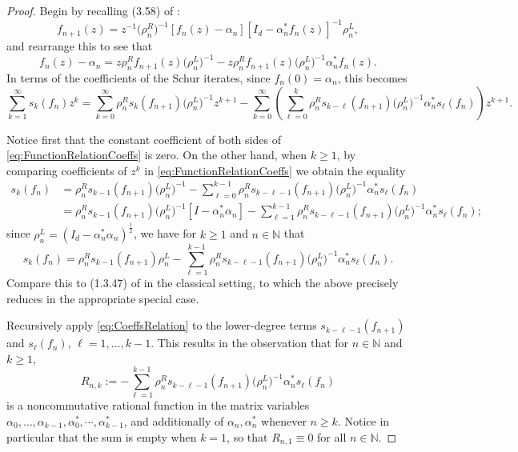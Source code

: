 \documentclass[11pt,reqno]{amsart}
\def\a{\alpha}
\def\r{\rho}
\def\NN{\mathbb{N}}
\theoremstyle{definition}
\numberwithin{equation}{section}
\begin{document}
\begin{proof}
    Begin by recalling (3.58) of \cite{DPS08}:
    \[
        f_{n+1}(z) = z^{-1} \big(\r_n^R\big)^{-1}[f_n(z) - \a_n][I_d - \a_n^* f_n(z)]^{-1} \r_n^L,
    \]
    and rearrange this to see that
    \[
        f_n(z) - \a_n = z \r_n^R f_{n+1}(z)\big(\r_n^L\big)^{-1} - z \r_n^R f_{n+1}(z)\big(\r_n^L\big)^{-1} \a_n^* f_n(z).
    \]
    In terms of the coefficients of the Schur iterates, since \(f_n(0) = \a_n\), this becomes
    \begin{equation}
    \label{eq:FunctionRelationCoeffs}
        \sum_{k=1}^{\infty} s_k(f_n) z^k = \sum_{k=0}^{\infty} \r_n^R s_k(f_{n+1}) \big(\r_n^L\big)^{-1} z^{k+1} - \sum_{k=0}^{\infty} \left( \sum_{\ell = 0}^{k} \r_n^R s_{k - \ell}(f_{n+1})\big(\r_n^L\big)^{-1} \a_n^* s_{\ell}(f_n)\right) z^{k+1}.
    \end{equation}
    
    Notice first that the constant coefficient of both sides of \eqref{eq:FunctionRelationCoeffs} is zero. On the other hand, when \(k \geq 1\), by comparing coefficients of \(z^k\) in \eqref{eq:FunctionRelationCoeffs} we obtain the equality
    \begin{align*}
        s_k(f_n) & = \r_n^R s_{k-1}(f_{n+1})\big(\r_n^L\big)^{-1} - \sum_{\ell = 0}^{k-1} \r_n^R s_{k - \ell - 1}(f_{n+1}) \big(\r_n^L\big)^{-1} \a_n^* s_{\ell}(f_n) \\
        & = \r_n^R s_{k-1}(f_{n+1}) \big(\r_n^L \big)^{-1}[I - \a_n^* \a_n] - \sum_{\ell=1}^{k-1} \r_n^R s_{k - \ell - 1}(f_{n+1})\big(\r_n^L\big)^{-1} \a_n^* s_{\ell}(f_n);
    \end{align*}
    since \(\r_n^L = (I_d - \a_n^* \a_n)^{\frac12}\), we have for \(k \geq 1\) and \(n \in \NN\) that
    \begin{equation}
    \label{eq:CoeffsRelation}
        s_k(f_n) = \r_n^R s_{k-1}(f_{n+1}) \r_n^L - \sum_{\ell=1}^{k-1} \r_n^R s_{k - \ell - 1}(f_{n+1})\big(\r_n^L\big)^{-1} \a_n^* s_{\ell}(f_n).
    \end{equation}
    Compare this to (1.3.47) of \cite{Sim05a} in the classical setting, to which the above precisely reduces in the appropriate special case.

    Recursively apply \eqref{eq:CoeffsRelation} to the lower-degree terms \(s_{k - \ell - 1}(f_{n+1})\) and \(s_{\ell}(f_n)\), \(\ell = 1, \ldots, k - 1\). This results in the observation that for \(n \in \NN\) and \(k \geq 1\),
    \[
        R_{n,k} := - \sum_{\ell=1}^{k-1} \r_n^R s_{k - \ell - 1}(f_{n+1})\big(\r_n^L\big)^{-1} \a_n^* s_{\ell}(f_n)
    \]
    is a noncommutative rational function in the matrix variables \(\a_0, \ldots, \a_{k-1}, \a_0^*, \cdots, \a_{k-1}^*\), and additionally of \(\a_n, \a_n^*\) whenever \(n \geq k\). Notice in particular that the sum is empty when \(k = 1\), so that \(R_{n,1} \equiv 0\) for all \(n \in \NN\).


\end{proof}
\end{document}
